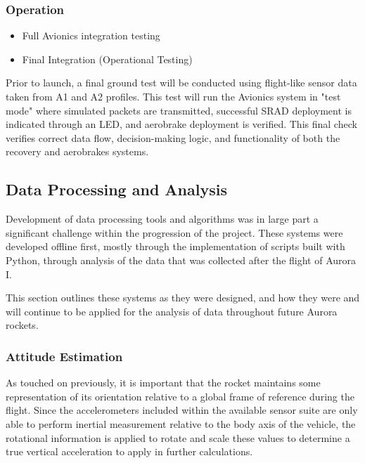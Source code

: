\subsubsection{Operation}
\begin{itemize}
  \item Full Avionics integration testing  
  \item Final Integration (Operational Testing) 
\end{itemize}

Prior to launch, a final ground test will be conducted using flight-like sensor data taken from A1 and A2 profiles. This test will run the Avionics system in "test mode" where simulated packets are transmitted, successful SRAD deployment is indicated through an LED, and aerobrake deployment is verified. This final check verifies correct data flow, decision-making logic, and functionality of both the recovery and aerobrakes systems. 


\subsection{Data Processing and Analysis}
Development of data processing tools and algorithms was in large part a significant challenge within the progression of the project. These systems were developed offline first, mostly through the implementation of scripts built with Python, through analysis of the data that was collected after the flight of Aurora I. 

This section outlines these systems as they were designed, and how they were and will continue to be applied for the analysis of data throughout future Aurora rockets.

\subsubsection{Attitude Estimation}
As touched on previously, it is important that the rocket maintains some representation of its orientation relative to a global frame of reference during the flight. Since the accelerometers included within the available sensor suite are only able to perform inertial measurement relative to the body axis of the vehicle, the rotational information is applied to rotate and scale these values to determine a true vertical acceleration to apply in further calculations.

